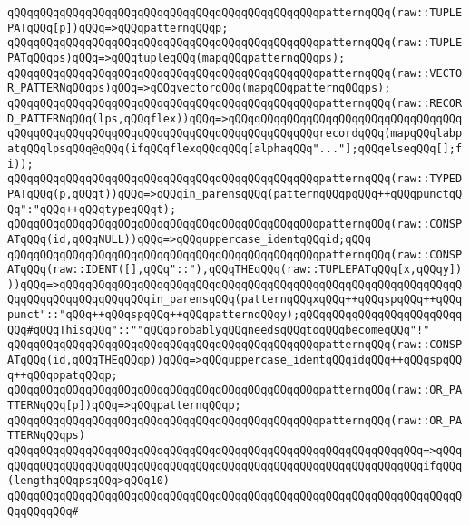\verb|qQQqqQQqqQQqqQQqqQQqqQQqqQQqqQQqqQQqqQQqqQQqqQQqpatternqQQq(raw::TUPLEPATqQQq[p])qQQq=>qQQqpatternqQQqp;|\newline
\verb|qQQqqQQqqQQqqQQqqQQqqQQqqQQqqQQqqQQqqQQqqQQqqQQqpatternqQQq(raw::TUPLEPATqQQqps)qQQq=>qQQqtupleqQQq(mapqQQqpatternqQQqps);|\newline
\verb|qQQqqQQqqQQqqQQqqQQqqQQqqQQqqQQqqQQqqQQqqQQqqQQqpatternqQQq(raw::VECTOR_PATTERNqQQqps)qQQq=>qQQqvectorqQQq(mapqQQqpatternqQQqps);|\newline
\verb|qQQqqQQqqQQqqQQqqQQqqQQqqQQqqQQqqQQqqQQqqQQqqQQqpatternqQQq(raw::RECORD_PATTERNqQQq(lps,qQQqflex))qQQq=>qQQqqQQqqQQqqQQqqQQqqQQqqQQqqQQqqQQqqQQqqQQqqQQqqQQqqQQqqQQqqQQqqQQqqQQqqQQqqQQqqQQqrecordqQQq(mapqQQqlabpatqQQqlpsqQQq@qQQq(ifqQQqflexqQQqqQQq[alphaqQQq"..."];qQQqelseqQQq[];fi));|\newline
\verb|qQQqqQQqqQQqqQQqqQQqqQQqqQQqqQQqqQQqqQQqqQQqqQQqpatternqQQq(raw::TYPEDPATqQQq(p,qQQqt))qQQq=>qQQqin_parensqQQq(patternqQQqpqQQq++qQQqpunctqQQq":"qQQq++qQQqtypeqQQqt);|\newline
\verb|qQQqqQQqqQQqqQQqqQQqqQQqqQQqqQQqqQQqqQQqqQQqqQQqpatternqQQq(raw::CONSPATqQQq(id,qQQqNULL))qQQq=>qQQquppercase_identqQQqid;qQQq|\newline
\verb|qQQqqQQqqQQqqQQqqQQqqQQqqQQqqQQqqQQqqQQqqQQqqQQqpatternqQQq(raw::CONSPATqQQq(raw::IDENT([],qQQq"::"),qQQqTHEqQQq(raw::TUPLEPATqQQq[x,qQQqy])))qQQq=>qQQqqQQqqQQqqQQqqQQqqQQqqQQqqQQqqQQqqQQqqQQqqQQqqQQqqQQqqQQqqQQqqQQqqQQqqQQqqQQqqQQqin_parensqQQq(patternqQQqxqQQq++qQQqspqQQq++qQQqpunct"::"qQQq++qQQqspqQQq++qQQqpatternqQQqy);qQQqqQQqqQQqqQQqqQQqqQQqqQQq#qQQqThisqQQq"::""qQQqprobablyqQQqneedsqQQqtoqQQqbecomeqQQq"!"|\newline
\verb|qQQqqQQqqQQqqQQqqQQqqQQqqQQqqQQqqQQqqQQqqQQqqQQqpatternqQQq(raw::CONSPATqQQq(id,qQQqTHEqQQqp))qQQq=>qQQquppercase_identqQQqidqQQq++qQQqspqQQq++qQQqppatqQQqp;|\newline
\verb|qQQqqQQqqQQqqQQqqQQqqQQqqQQqqQQqqQQqqQQqqQQqqQQqpatternqQQq(raw::OR_PATTERNqQQq[p])qQQq=>qQQqpatternqQQqp;|\newline
\newline
\verb|qQQqqQQqqQQqqQQqqQQqqQQqqQQqqQQqqQQqqQQqqQQqqQQqpatternqQQq(raw::OR_PATTERNqQQqps)|\newline
\verb|qQQqqQQqqQQqqQQqqQQqqQQqqQQqqQQqqQQqqQQqqQQqqQQqqQQqqQQqqQQqqQQq=>qQQq|\newline
\verb|qQQqqQQqqQQqqQQqqQQqqQQqqQQqqQQqqQQqqQQqqQQqqQQqqQQqqQQqqQQqqQQqifqQQq(lengthqQQqpsqQQq>qQQq10)|\newline
\verb|qQQqqQQqqQQqqQQqqQQqqQQqqQQqqQQqqQQqqQQqqQQqqQQqqQQqqQQqqQQqqQQqqQQqqQQqqQQqqQQq#|\newline
